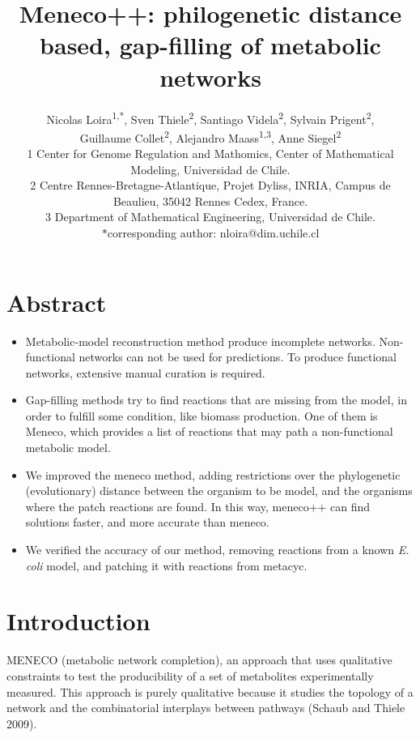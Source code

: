 \documentclass{article}
\title{Meneco++: philogenetic distance based, gap-filling of metabolic networks}
\author{Nicolas Loira\textsuperscript{1,*},
Sven Thiele\textsuperscript{2},
Santiago Videla\textsuperscript{2},
Sylvain Prigent\textsuperscript{2},\\
Guillaume Collet\textsuperscript{2},
Alejandro Maass\textsuperscript{1,3},
Anne Siegel\textsuperscript{2}\\
{\scriptsize 1 Center for Genome Regulation and Mathomics, Center of Mathematical Modeling, Universidad de Chile.}\\
{\scriptsize 2 Centre Rennes-Bretagne-Atlantique, Projet Dyliss, INRIA, Campus de Beaulieu, 35042 Rennes Cedex, France.}\\
{\scriptsize 3 Department of Mathematical Engineering, Universidad de Chile.} \\
{\scriptsize $*$corresponding author: nloira@dim.uchile.cl}
}
\begin{document}
\maketitle

\section{Abstract}

\begin{itemize}
	\item Metabolic-model reconstruction method produce incomplete networks. Non-functional networks can not be used for predictions. To produce functional networks, extensive manual curation is required.
	\item Gap-filling methods try to find reactions that are missing from the model, in order to fulfill some condition, like biomass production. One of them is Meneco, which provides a list of reactions that may path a non-functional metabolic model.
	\item We improved the meneco method, adding restrictions over the phylogenetic (evolutionary) distance between the organism to be model, and the organisms where the patch reactions are found. In this way, meneco++ can find solutions faster, and more accurate than meneco.
	\item We verified the accuracy of our method, removing reactions from a known \emph{E. coli} model, and patching it with reactions from metacyc. 
\end{itemize}



\section{Introduction}

MENECO (metabolic network completion), an approach that uses qualitative constraints to test the producibility of a set of metabolites experimentally measured. This approach is purely qualitative because it studies the topology of a network and the combinatorial interplays between pathways (Schaub and Thiele 2009).
\end{document}
